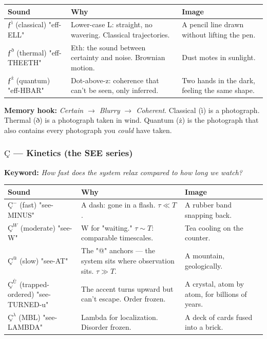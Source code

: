 \documentclass[12pt,a4paper]{article}
\begin{document}
\begin{table}[htbp]
\centering
\small
{}
\begin{tabularx}{\textwidth}{>{\centering\arraybackslash}X >{\centering\arraybackslash}X >{\centering\arraybackslash}X}
\toprule
\rowcolor{gray!25}\textbf{Sound} & \textbf{Why} & \textbf{Image} \\
\midrule
\rowcolors{1}{white}{gray!10}
\textbf{$ƒ^{\text{ì}}$} (classical) "eff-ELL" & Lower-case L: straight, no wavering. Classical trajectories. & A pencil line drawn without lifting the pen. \\
\textbf{$ƒ^{\text{ð}}$} (thermal) "eff-THEETH" & Eth: the sound between certainty and noise. Brownian motion. & Dust motes in sunlight. \\
\textbf{$ƒ^{\text{ż}}$} (quantum) "eff-HBAR" & Dot-above-z: coherence that can't be seen, only inferred. & Two hands in the dark, feeling the same shape. \\
\bottomrule
\end{tabularx}
\end{table}

\textbf{Memory hook:} \emph{Certain $\rightarrow$ Blurry $\rightarrow$ Coherent}. Classical (ì) is a photograph. Thermal (ð) is a photograph taken in wind. Quantum (ż) is the photograph that also contains every photograph you \emph{could} have taken.

\subsubsection{$Ç$ --- Kinetics (the \textbf{SEE} series)}

\textbf{Keyword:} \emph{How fast does the system relax compared to how long we watch?}

\begin{table}[htbp]
\centering
\small
{}
\begin{tabularx}{\textwidth}{>{\centering\arraybackslash}X >{\centering\arraybackslash}X >{\centering\arraybackslash}X}
\toprule
\rowcolor{gray!25}\textbf{Sound} & \textbf{Why} & \textbf{Image} \\
\midrule
\rowcolors{1}{white}{gray!10}
\textbf{$Ç^{-}$} (fast) "see-MINUS" & A dash: gone in a flash. $\tau \ll T$. & A rubber band snapping back. \\
\textbf{$Ç^{W}$} (moderate) "see-W" & W for "waiting." $\tau \sim T$: comparable timescales. & Tea cooling on the counter. \\
\textbf{$Ç^{@}$} (slow) "see-AT" & The "@" anchors --- the system sits where observation sits. $\tau \gg T$. & A mountain, geologically. \\
\textbf{$Ç^{\text{Ù}}$} (trapped-ordered) "see-TURNED-u" & The accent turns upward but can't escape. Order frozen. & A crystal, atom by atom, for billions of years. \\
\textbf{$Ç^{\lambda}$} (MBL) "see-LAMBDA" & Lambda for localization. Disorder frozen. & A deck of cards fused into a brick. \\
\bottomrule
\end{tabularx}
\end{table}
\end{document}
